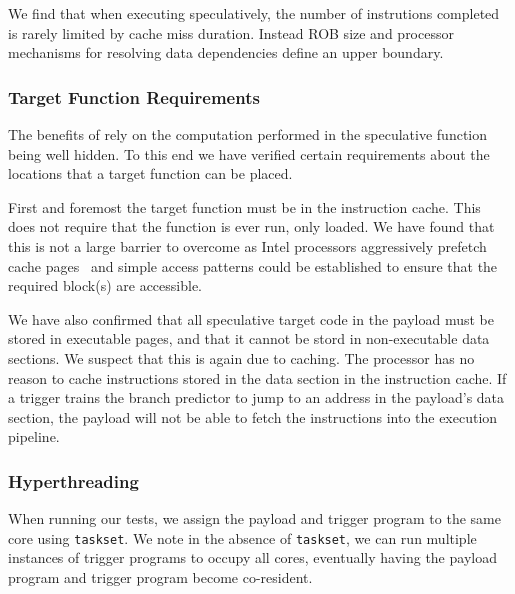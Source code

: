 \medskip

We find that when executing speculatively, the number of instrutions completed
is rarely limited by cache miss duration. Instead
ROB size and processor mechanisms for resolving
data dependencies define an upper boundary.


\subsubsection{Target Function Requirements}
The benefits of \speculake rely on the computation performed in the
speculative function being well hidden. To this end we have verified 
certain requirements about the locations that a target function can 
be placed. 

First and foremost the target function must be in the instruction cache. 
This does not require that the function is ever run, only loaded. We have 
found that this is not a large barrier to overcome as Intel 
processors aggressively prefetch cache pages~\cite{measuring-cache}
and simple access patterns could be established to ensure
that the required block(s) are accessible. 

We have also confirmed that all speculative target code in the payload  
must be stored in executable pages, and that it cannot be stord in non-executable 
data sections.  We suspect that this is again due to caching. The processor
has no reason to cache instructions stored in the data section in the 
instruction cache. If a trigger trains the branch predictor 
to jump to an address in the payload's data section, the payload will not 
be able to fetch the instructions into the execution pipeline. 

\subsubsection{Hyperthreading}

When running our tests, we assign the payload and trigger program to the same
core using \texttt{taskset}. We note in the absence of \texttt{taskset}, we can
run multiple instances of trigger programs to occupy all cores, eventually
having the payload program and trigger program become co-resident.

